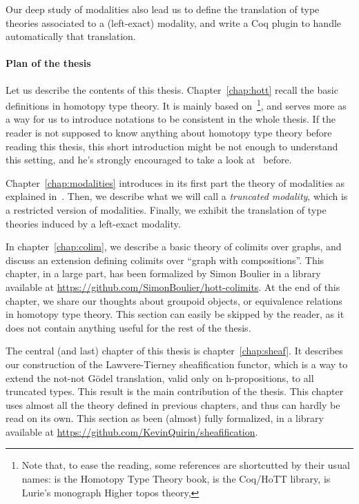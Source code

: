 Our deep study of modalities also lead us to 
define the translation of
type theories associated to a (left-exact) modality, and write a Coq
plugin to handle automatically that translation.


\paragraph*{Plan of the thesis}

Let us describe the contents of this thesis. Chapter~\ref{chap:hott}
recall the basic definitions in homotopy type theory. It is mainly
based on~\cite{hottbook}\footnote{Note that, to ease the reading, some
  references are shortcutted by their usual names: \cite{hottbook} is
  the Homotopy Type Theory book, \cite{hottlib} is the Coq/HoTT
  library, \cite{lurie} is Lurie's monograph Higher topos theory,
  \etc}, and serves more as a way for us to introduce notations to be
consistent in the whole thesis. If the reader is not supposed to know
anything about homotopy type theory before reading this thesis, this
short introduction might be not enough to understand this setting, and
he's strongly encouraged to take a look at~\cite{hottbook} before.

Chapter~\ref{chap:modalities} introduces in its first part the theory
of modalities as explained in~\cite{hottbook}. Then, we describe what
we will call a {\em truncated modality}, which is a restricted version
of modalities. Finally, we exhibit the translation of type theories
induced by a left-exact modality.

In chapter~\ref{chap:colim}, we describe a basic theory of colimits
over graphs, and discuss an extension defining colimits over ``graph
with compositions''. This chapter, in a large part, has been
formalized by Simon Boulier in a library available at
\url{https://github.com/SimonBoulier/hott-colimits}. At the end of
this chapter, we share our thoughts about groupoid objects, or
equivalence relations in homotopy type theory. This section can easily
be skipped by the reader, as it does not contain anything useful for
the rest of the thesis.

The central (and last) chapter of this thesis is
chapter~\ref{chap:sheaf}. It describes our construction of the
Lawvere-Tierney sheafification functor, which is a way to extend the
not-not Gödel translation, valid only on h-propositions, to all
truncated types. This result is the main contribution of the thesis.
This chapter uses almost all the theory defined in
previous chapters, and thus can hardly be read on its own. This
section as been (almost) fully formalized, in a library available at
\url{https://github.com/KevinQuirin/sheafification}.


